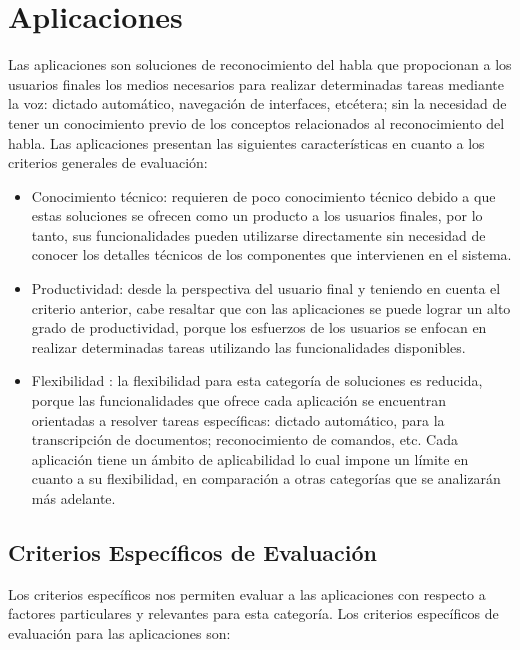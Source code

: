 \section{Aplicaciones}
\label{sec:aplicaciones}

Las aplicaciones son soluciones de reconocimiento del habla que propocionan
a los usuarios finales los medios necesarios para realizar determinadas tareas mediante
la voz: dictado autom\'atico, navegaci\'on de interfaces, etc\'etera; sin
la necesidad de tener un conocimiento previo de los conceptos relacionados al
reconocimiento del habla. Las aplicaciones presentan las siguientes 
caracter\'isticas en cuanto a los criterios generales de evaluaci\'on:

\begin{itemize}
    \item Conocimiento t\'ecnico: requieren de poco conocimiento  t\'ecnico debido a que estas
        soluciones se ofrecen como un producto a los usuarios finales, por lo tanto, sus funcionalidades
        pueden utilizarse directamente sin necesidad de conocer los detalles t\'ecnicos de
        los componentes que intervienen en el sistema.
    \item Productividad: desde la perspectiva del usuario final y teniendo en cuenta el criterio anterior, 
        cabe resaltar que con
        las aplicaciones se puede lograr un alto grado de productividad, porque los esfuerzos
        de los usuarios se enfocan en realizar determinadas tareas utilizando las funcionalidades
        disponibles.
    \item Flexibilidad : la flexibilidad para esta categor\'ia de soluciones es reducida, porque las
        funcionalidades que ofrece cada aplicaci\'on se encuentran orientadas a resolver tareas
        espec\'ificas: dictado autom\'atico, para la transcripci\'on de documentos; reconocimiento
        de comandos, etc. Cada aplicaci\'on tiene un \'ambito de aplicabilidad
        lo cual impone un l\'imite en cuanto a su flexibilidad, en comparaci\'on a otras categor\'ias que
        se analizarán m\'as adelante.
\end{itemize}

\subsection{Criterios Espec\'ificos de Evaluaci\'on}

Los criterios espec\'ificos nos permiten evaluar a las aplicaciones con respecto a factores
particulares y relevantes para esta categor\'ia. Los criterios 
espec\'ificos de evaluaci\'on para las aplicaciones son:

